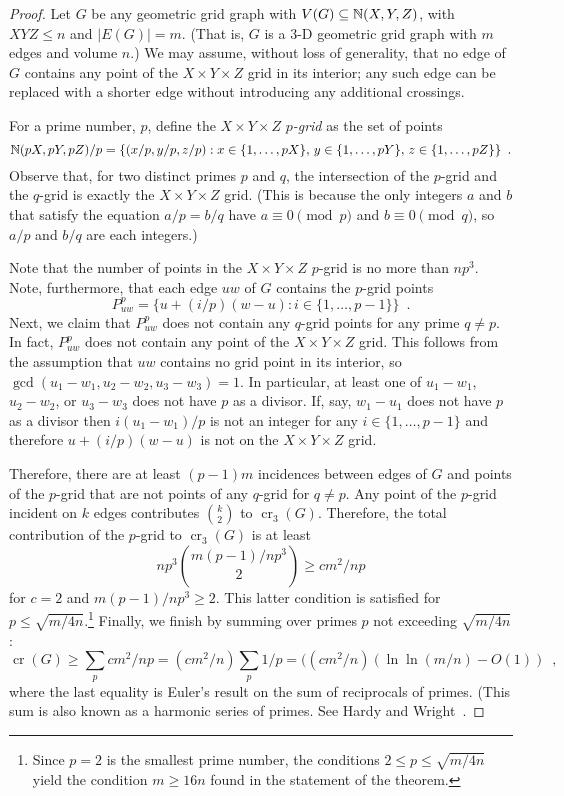 \documentclass{patmorin}
\DeclareMathOperator{\crs}{cr}
\begin{document}
\begin{proof}
  Let $G$ be any geometric grid graph with $V(G)\subseteq\mathbb{N}(X,Y,Z)$,
  with $XYZ\le n$ and $|E(G)|=m$. (That is, $G$ is a 3-D geometric grid
  graph with $m$ edges and volume $n$.)  We may assume, without loss of
  generality, that no edge of $G$ contains any point of the $X\times
  Y\times Z$ grid in its interior; any such edge can be replaced with
  a shorter edge without introducing any additional crossings.

  For a prime number, $p$, define the $X\times Y\times Z$ \emph{$p$-grid}
  as the set of points
  \[
    \mathbb{N}(pX,pY,pZ)/p = \{(x/p,y/p,z/p): x\in\{1,\ldots,pX\},\,
    y\in\{1,\ldots,pY\},\, z\in\{1,\ldots,pZ\}\} \enspace .
  \]
  Observe that, for two distinct primes $p$ and $q$, the intersection
  of the $p$-grid and the $q$-grid is exactly the $X\times Y\times Z$
  grid. (This is because the only integers $a$ and $b$ that satisfy the
  equation $a/p = b/q$ have $a\equiv 0 \pmod{p}$ and $b\equiv 0\pmod q$,
  so $a/p$ and $b/q$ are each integers.)

  Note that the number of points in the $X\times Y\times Z$ $p$-grid is
  no more than $np^3$.  Note, furthermore, that each edge $uw$ of $G$
  contains the $p$-grid points
  \[
      P_{uw}^p = \{ u+(i/p)(w-u) : i\in\{1,\ldots,p-1\} \} \enspace .
  \]
  Next, we claim that $P_{uw}^p$ does not contain any $q$-grid points for
  any prime $q\neq p$.  In fact, $P_{uw}^p$ does not contain any point
  of the $X\times Y\times Z$ grid.  This follows from the assumption that
  $uw$ contains no grid point in its interior, so $\gcd(u_1-w_1, u_2-w_2,
  u_3-w_3)=1$.  In particular, at least one of $u_1-w_1$, $u_2-w_2$,
  or $u_3-w_3$ does not have $p$ as a divisor.  If, say, $w_1-u_1$ does
  not have $p$ as a divisor then $i(u_1-w_1)/p$ is not an integer for
  any $i\in\{1,\ldots,p-1\}$ and therefore $u+(i/p)(w-u)$ is not on the
  $X\times Y\times Z$ grid.
  
  Therefore, there are at least $(p-1)m$ incidences between edges of $G$
  and points of the $p$-grid that are not points of any $q$-grid for
  $q\neq p$.  Any point of the $p$-grid incident on $k$ edges contributes
  $\binom{k}{2}$ to $\crs_3(G)$.  Therefore, the total contribution of
  the $p$-grid to $\crs_3(G)$ is at least
  \[
      np^3\binom{m(p-1)/np^3}{2} \ge cm^2/np
  \]
  for $c=2$ and $m(p-1)/np^3 \ge 2$.  This latter condition is satisfied
  for $p \le \sqrt{m/4n}$.\footnote{Since $p=2$ is the smallest prime
  number, the conditions $2\le p\le\sqrt{m/4n}$ yield the
  condition $m\ge 16n$ found in the statement of the theorem.} Finally,
  we finish by summing over primes $p$ not exceeding $\sqrt{m/4n}$:
  \[
     \crs(G) \ge \sum_{p} cm^2/np 
             = (cm^2/n) \sum_p 1/p 
             = ((cm^2/n)(\ln\ln(m/n)-O(1)) \enspace ,
  \]
  where the last equality is Euler's result on the sum of reciprocals
  of primes. (This sum is also known as a harmonic series of primes.
  See Hardy and Wright~\cite[Section~22.7]{hardy.wright:introduction}.
\end{proof}
\end{document}
